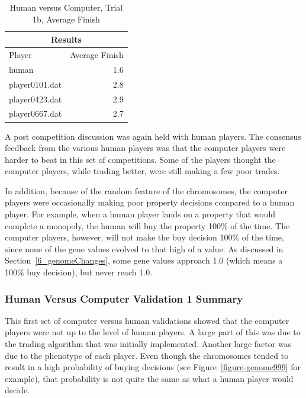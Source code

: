 \begin{table}[htbp]
  \centering
  \caption{Human versus Computer, Trial 1b, Average Finish}
    \begin{tabular}{lr}
    \toprule
    \multicolumn{2}{c}{Results} \\
    \midrule
    Player & Average Finish \\
    \multicolumn{1}{l}{human} & 1.6 \\
    \multicolumn{1}{l}{player0101.dat} & 2.8 \\
    \multicolumn{1}{l}{player0423.dat} & 2.9 \\
    \multicolumn{1}{l}{player0667.dat} & 2.7 \\
    \bottomrule
    \end{tabular}%
  \label{tab:human_results1d}%
\end{table}%

A post competition discussion was again held with human players. The consensus
feedback from the various human players was that the computer players were
harder to beat in this set of competitions. Some of the players thought the
computer players, while trading better, were still making a few poor trades.

In addition, because of the random feature of the chromosomes, the computer
players were occasionally making poor property decisions compared to a human
player. For example, when a human player lands on a property that would complete
a monopoly, the human will buy the property 100\% of the time. The computer
players, however, will not make the buy decision 100\% of the time, since none
of the gene values evolved to that high of a value. As discussed in
Section~\ref{6_genomeChanges}, some gene values approach 1.0 (which means a
100\% buy decision), but never reach 1.0.

\subsubsection{Human Versus Computer Validation 1 Summary}

This first set of computer versus human validations showed that the computer
players were not up to the level of human players. A large part of
this was due to the trading algorithm that was initially implemented. Another
large factor was due to the phenotype of each player. Even though the
chromosomes tended to result in a high probability of buying decisions (see
Figure~\ref{figure-genome999} for example), that probability is not quite the
same as what a human player would decide. 

